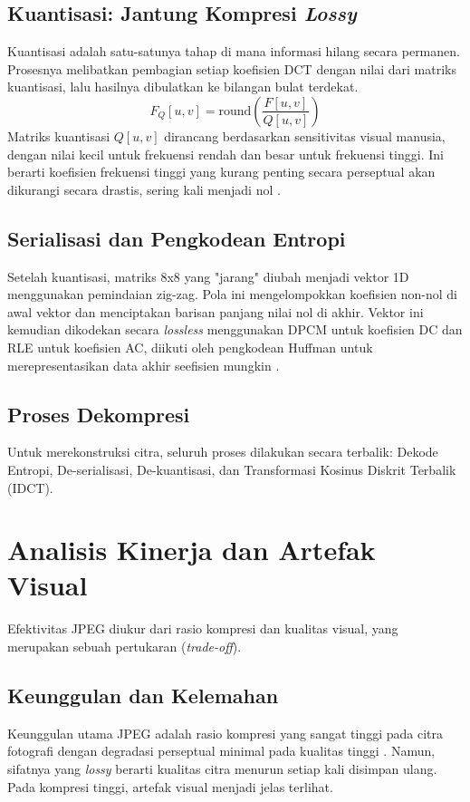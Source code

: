 \documentclass[a4paper]{article}
\begin{document}
\subsection{Kuantisasi: Jantung Kompresi \textit{Lossy}}
Kuantisasi adalah satu-satunya tahap di mana informasi hilang secara permanen. Prosesnya melibatkan pembagian setiap koefisien DCT dengan nilai dari matriks kuantisasi, lalu hasilnya dibulatkan ke bilangan bulat terdekat.
\begin{equation} \label{eq:quantization}
  F_Q[u, v] = \text{round}\left(\frac{F[u, v]}{Q[u, v]}\right)
\end{equation}
Matriks kuantisasi $Q[u,v]$ dirancang berdasarkan sensitivitas visual manusia, dengan nilai kecil untuk frekuensi rendah dan besar untuk frekuensi tinggi. Ini berarti koefisien frekuensi tinggi yang kurang penting secara perseptual akan dikurangi secara drastis, sering kali menjadi nol \cite{wallace1991jpeg}.

\subsection{Serialisasi dan Pengkodean Entropi}
Setelah kuantisasi, matriks 8x8 yang "jarang" diubah menjadi vektor 1D menggunakan pemindaian zig-zag. Pola ini mengelompokkan koefisien non-nol di awal vektor dan menciptakan barisan panjang nilai nol di akhir. Vektor ini kemudian dikodekan secara \textit{lossless} menggunakan DPCM untuk koefisien DC dan RLE untuk koefisien AC, diikuti oleh pengkodean Huffman untuk merepresentasikan data akhir seefisien mungkin \cite{wallace1991jpeg}.

\subsection{Proses Dekompresi}
Untuk merekonstruksi citra, seluruh proses dilakukan secara terbalik: Dekode Entropi, De-serialisasi, De-kuantisasi, dan Transformasi Kosinus Diskrit Terbalik (IDCT).

\section{Analisis Kinerja dan Artefak Visual}
Efektivitas JPEG diukur dari rasio kompresi dan kualitas visual, yang merupakan sebuah pertukaran (\textit{trade-off}).

\subsection{Keunggulan dan Kelemahan}
Keunggulan utama JPEG adalah rasio kompresi yang sangat tinggi pada citra fotografi dengan degradasi perseptual minimal pada kualitas tinggi \cite{wallace1991jpeg}. Namun, sifatnya yang \textit{lossy} berarti kualitas citra menurun setiap kali disimpan ulang. Pada kompresi tinggi, artefak visual menjadi jelas terlihat.
\end{document}
